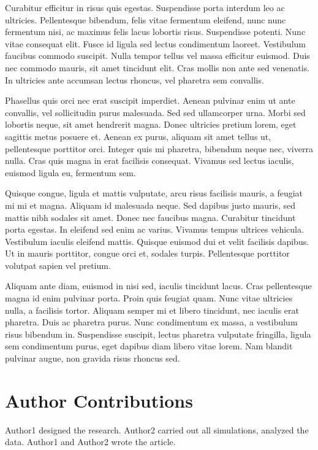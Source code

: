 \documentclass[
  oneside,
  open=any]{scrbook}
\begin{document}
Curabitur efficitur in risus quis egestas. Suspendisse porta interdum
leo ac ultricies. Pellentesque bibendum, felis vitae fermentum eleifend,
nunc nunc fermentum nisi, ac maximus felis lacus lobortis risus.
Suspendisse potenti. Nunc vitae consequat elit. Fusce id ligula sed
lectus condimentum laoreet. Vestibulum faucibus commodo suscipit. Nulla
tempor tellus vel massa efficitur euismod. Duis nec commodo mauris, sit
amet tincidunt elit. Cras mollis non ante sed venenatis. In ultricies
ante accumsan lectus rhoncus, vel pharetra sem convallis.

Phasellus quis orci nec erat suscipit imperdiet. Aenean pulvinar enim ut
ante convallis, vel sollicitudin purus malesuada. Sed sed ullamcorper
urna. Morbi sed lobortis neque, sit amet hendrerit magna. Donec
ultricies pretium lorem, eget sagittis metus posuere et. Aenean ex
purus, aliquam sit amet tellus ut, pellentesque porttitor orci. Integer
quis mi pharetra, bibendum neque nec, viverra nulla. Cras quis magna in
erat facilisis consequat. Vivamus sed lectus iaculis, euismod ligula eu,
fermentum sem.

Quisque congue, ligula et mattis vulputate, arcu risus facilisis mauris,
a feugiat mi mi et magna. Aliquam id malesuada neque. Sed dapibus justo
mauris, sed mattis nibh sodales sit amet. Donec nec faucibus magna.
Curabitur tincidunt porta egestas. In eleifend sed enim ac varius.
Vivamus tempus ultrices vehicula. Vestibulum iaculis eleifend mattis.
Quisque euismod dui et velit facilisis dapibus. Ut in mauris porttitor,
congue orci et, sodales turpis. Pellentesque porttitor volutpat sapien
vel pretium.

Aliquam ante diam, euismod in nisi sed, iaculis tincidunt lacus. Cras
pellentesque magna id enim pulvinar porta. Proin quis feugiat quam. Nunc
vitae ultricies nulla, a facilisis tortor. Aliquam semper mi et libero
tincidunt, nec iaculis erat pharetra. Duis ac pharetra purus. Nunc
condimentum ex massa, a vestibulum risus bibendum in. Suspendisse
suscipit, lectus pharetra vulputate fringilla, ligula sem condimentum
purus, eget dapibus diam libero vitae lorem. Nam blandit pulvinar augue,
non gravida risus rhoncus sed.

\hypertarget{author-contributions}{%
\chapter{Author Contributions}\label{author-contributions}}

Author1 designed the research. Author2 carried out all simulations,
analyzed the data. Author1 and Author2 wrote the article.
\end{document}
